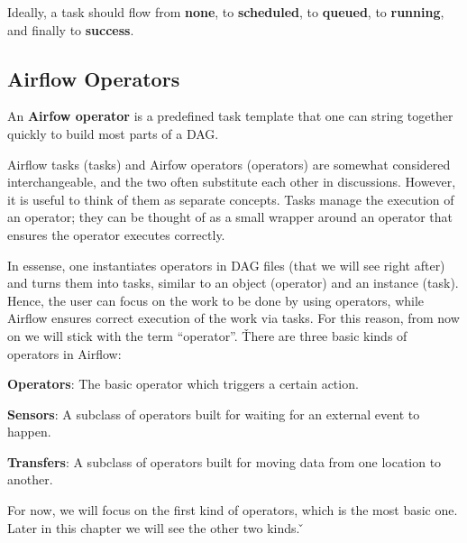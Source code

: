 Ideally, a task should flow from \textbf{none}, to \textbf{\textcolor{scheduled}{scheduled}}, to
\textbf{\textcolor{queued}{queued}}, to \textbf{\textcolor{running}{running}}, and finally to
\textbf{\textcolor{success}{success}}.


\subsection{Airflow Operators}

An \textbf{Airfow operator} is a predefined task template that one can string together quickly to build most parts of a
DAG\@.
\ed

Airflow tasks (tasks) and Airfow operators (operators) are somewhat considered interchangeable, and the two
often substitute each other in discussions. However, it is useful to think of them as separate concepts. Tasks
manage the execution of an operator; they can be thought of as a small wrapper around an operator that ensures the
operator executes correctly.


In essense, one instantiates operators in DAG files (that we will see right after) and turns them into tasks,
similar to an object (operator) and an instance (task). Hence, the user can focus on the work to be done by using
operators, while Airflow ensures correct execution of the work via tasks. For this reason, from now on we will stick
with the term ``operator''. \v

There are three basic kinds of operators in Airflow:
\bit
\item \textbf{Operators}: The basic operator which triggers a certain action.
\item \textbf{Sensors}: A subclass of operators built for waiting for an external event to happen.
\item \textbf{Transfers}: A subclass of operators built for moving data from one location to another.
\eit

For now, we will focus on the first kind of operators, which is the most basic one. Later in this chapter we will see
the other two kinds. \v

